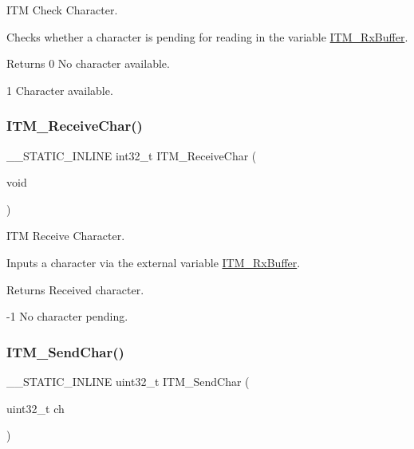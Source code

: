 I\+TM Check Character. 

Checks whether a character is pending for reading in the variable \mbox{\hyperlink{group__CMSIS__core__DebugFunctions_ga12e68e55a7badc271b948d6c7230b2a8}{I\+T\+M\+\_\+\+Rx\+Buffer}}. \begin{DoxyReturn}{Returns}
0 No character available. 

1 Character available. 
\end{DoxyReturn}
\mbox{\label{group__CMSIS__core__DebugFunctions_gac3ee2c30a1ac4ed34c8a866a17decd53}} 
\subsubsection{\texorpdfstring{ITM\_ReceiveChar()}{ITM\_ReceiveChar()}}
{\footnotesize\ttfamily \+\_\+\+\_\+\+S\+T\+A\+T\+I\+C\+\_\+\+I\+N\+L\+I\+NE int32\+\_\+t I\+T\+M\+\_\+\+Receive\+Char (\begin{DoxyParamCaption}\item[{void}]{ }\end{DoxyParamCaption})}



I\+TM Receive Character. 

Inputs a character via the external variable \mbox{\hyperlink{group__CMSIS__core__DebugFunctions_ga12e68e55a7badc271b948d6c7230b2a8}{I\+T\+M\+\_\+\+Rx\+Buffer}}. \begin{DoxyReturn}{Returns}
Received character. 

-\/1 No character pending. 
\end{DoxyReturn}
\mbox{\label{group__CMSIS__core__DebugFunctions_gac90a497bd64286b84552c2c553d3419e}} 
\subsubsection{\texorpdfstring{ITM\_SendChar()}{ITM\_SendChar()}}
{\footnotesize\ttfamily \+\_\+\+\_\+\+S\+T\+A\+T\+I\+C\+\_\+\+I\+N\+L\+I\+NE uint32\+\_\+t I\+T\+M\+\_\+\+Send\+Char (\begin{DoxyParamCaption}\item[{uint32\+\_\+t}]{ch }\end{DoxyParamCaption})}



